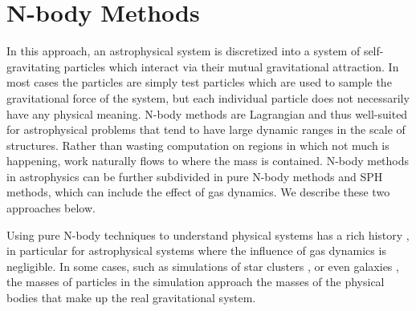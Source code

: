 \documentclass[11pt,twoside]{article}
\begin{document}
\section{N-body Methods}
\label{nbody}

In this approach, an astrophysical system is discretized into a system of self-gravitating particles which interact via their mutual gravitational attraction. In most cases the particles are simply test particles which are used to sample the gravitational force of the system, but each individual particle does not necessarily have any physical meaning. N-body methods are Lagrangian and thus well-suited for astrophysical problems that tend to have large dynamic ranges in the scale of structures. Rather than wasting computation on regions in which not much is happening, work naturally flows to where the mass is contained. N-body methods in astrophysics can be further subdivided in pure N-body methods and SPH methods, which can include the effect of gas dynamics. We describe these two approaches below.

Using pure N-body techniques to understand physical systems has a rich history \citep[see e.g.\ ][]{holmberg1941, hoerner1960, peebles1970, press1974}, in particular for astrophysical systems where the influence of gas dynamics is negligible. In some cases, such as simulations of star clusters \citep{wang2016}, or even galaxies \citep{bedorf2014}, the masses of particles in the simulation approach the masses of the physical bodies that make up the real gravitational system.
\end{document}
